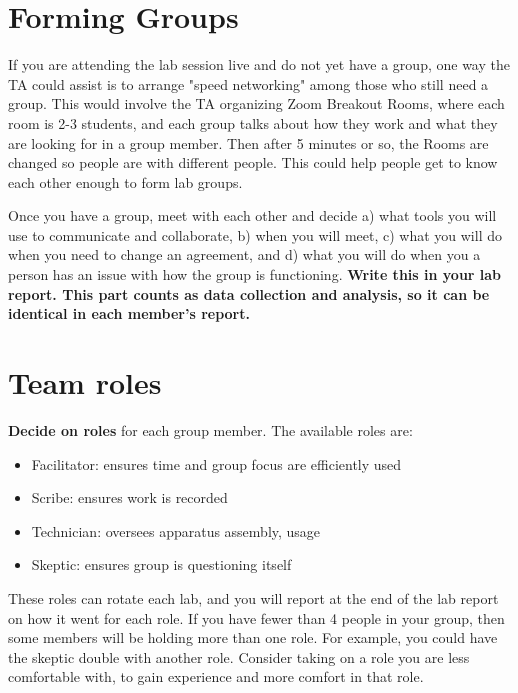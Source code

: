 \section{Forming Groups}

If you are attending the lab session live and do not yet have a group, one way the TA could assist is to arrange "speed networking" among those who still need a group. This would involve the TA organizing Zoom Breakout Rooms, where each room is 2-3 students, and each group talks about how they work and what they are looking for in a group member. Then after 5 minutes or so, the Rooms are changed so people are with different people. This could help people get to know each other enough to form lab groups.

\begin{steps}
	\item\label{ic:step:team-comm} Once you have a group, meet with each other and decide a) what tools you will use to communicate and collaborate, b) when you will meet, c) what you will do when you need to change an agreement, and d) what you will do when you a person has an issue with how the group is functioning.
	\textbf{Write this in your lab report. This part counts as data collection and analysis, so it can be identical in each member's report.}
\end{steps}

\section{Team roles}

\textbf{Decide on roles} for each group member. The available roles are:

\begin{itemize}
	\item Facilitator: ensures time and group focus are efficiently used
	\item Scribe: ensures work is recorded
	\item Technician: oversees apparatus assembly, usage
	\item Skeptic: ensures group is questioning itself
\end{itemize}

These roles can rotate each lab, and you will report at the end of the lab report on how it went for each role. If you have fewer than 4 people in your group, then some members will be holding more than one role. For example, you could have the skeptic double with another role. Consider taking on a role you are less comfortable with, to gain experience and more comfort in that role.

